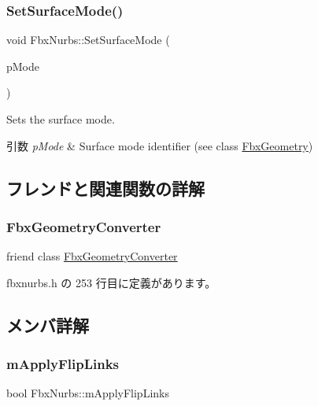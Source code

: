 \subsubsection{\texorpdfstring{Set\+Surface\+Mode()}{SetSurfaceMode()}}
{\footnotesize\ttfamily void Fbx\+Nurbs\+::\+Set\+Surface\+Mode (\begin{DoxyParamCaption}\item[{\hyperlink{class_fbx_geometry_adb9d2e34481a2cb40f1d783c665794db}{Fbx\+Geometry\+::\+E\+Surface\+Mode}}]{p\+Mode }\end{DoxyParamCaption})}

Sets the surface mode. 
\begin{DoxyParams}{引数}
{\em p\+Mode} & Surface mode identifier (see class \hyperlink{class_fbx_geometry}{Fbx\+Geometry}) \\
\hline
\end{DoxyParams}


\subsection{フレンドと関連関数の詳解}
\mbox{\label{class_fbx_nurbs_a2c65afd59c2bab21d92824fbe4422545}} 
\subsubsection{\texorpdfstring{Fbx\+Geometry\+Converter}{FbxGeometryConverter}}
{\footnotesize\ttfamily friend class \hyperlink{class_fbx_geometry_converter}{Fbx\+Geometry\+Converter}\hspace{0.3cm}{\ttfamily [friend]}}



 fbxnurbs.\+h の 253 行目に定義があります。



\subsection{メンバ詳解}
\mbox{\label{class_fbx_nurbs_a5776808fc0329e7634bd88eb5b1c5db0}} 
\subsubsection{\texorpdfstring{m\+Apply\+Flip\+Links}{mApplyFlipLinks}}
{\footnotesize\ttfamily bool Fbx\+Nurbs\+::m\+Apply\+Flip\+Links\hspace{0.3cm}{\ttfamily [protected]}}



